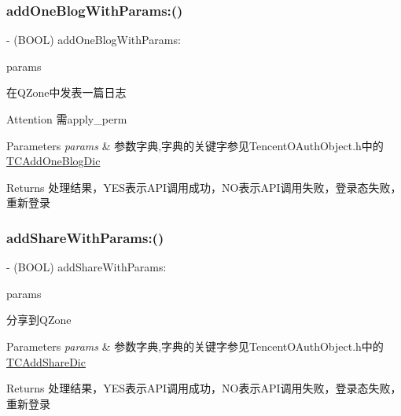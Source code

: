 \subsubsection{\texorpdfstring{add\+One\+Blog\+With\+Params\+:()}{addOneBlogWithParams:()}\hspace{0.1cm}{\footnotesize\ttfamily [2/2]}}
{\footnotesize\ttfamily -\/ (B\+O\+OL) add\+One\+Blog\+With\+Params\+: \begin{DoxyParamCaption}\item[{(N\+S\+Mutable\+Dictionary $\ast$)}]{params }\end{DoxyParamCaption}}

在\+Q\+Zone中发表一篇日志 \begin{DoxyAttention}{Attention}
需apply\+\_\+perm 
\end{DoxyAttention}

\begin{DoxyParams}{Parameters}
{\em params} & 参数字典,字典的关键字参见\+Tencent\+O\+Auth\+Object.\+h中的\mbox{\hyperlink{interface_t_c_add_one_blog_dic}{T\+C\+Add\+One\+Blog\+Dic}} \\
\hline
\end{DoxyParams}
\begin{DoxyReturn}{Returns}
处理结果，\+Y\+E\+S表示\+A\+P\+I调用成功，\+N\+O表示\+A\+P\+I调用失败，登录态失败，重新登录 
\end{DoxyReturn}
\mbox{\label{interface_tencent_o_auth_ab7f1ab3ecde38d8324456b306ebb3f7b}} 
\subsubsection{\texorpdfstring{add\+Share\+With\+Params\+:()}{addShareWithParams:()}\hspace{0.1cm}{\footnotesize\ttfamily [1/2]}}
{\footnotesize\ttfamily -\/ (B\+O\+OL) add\+Share\+With\+Params\+: \begin{DoxyParamCaption}\item[{(N\+S\+Mutable\+Dictionary $\ast$)}]{params }\end{DoxyParamCaption}}

分享到\+Q\+Zone 
\begin{DoxyParams}{Parameters}
{\em params} & 参数字典,字典的关键字参见\+Tencent\+O\+Auth\+Object.\+h中的\mbox{\hyperlink{interface_t_c_add_share_dic}{T\+C\+Add\+Share\+Dic}} \\
\hline
\end{DoxyParams}
\begin{DoxyReturn}{Returns}
处理结果，\+Y\+E\+S表示\+A\+P\+I调用成功，\+N\+O表示\+A\+P\+I调用失败，登录态失败，重新登录 
\end{DoxyReturn}
\mbox{\label{interface_tencent_o_auth_ab7f1ab3ecde38d8324456b306ebb3f7b}} 
